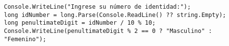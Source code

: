 \begin{lstlisting}
Console.WriteLine("Ingrese su número de identidad:");
long idNumber = long.Parse(Console.ReadLine() ?? string.Empty);
long penultimateDigit = idNumber / 10 % 10;
Console.WriteLine(penultimateDigit % 2 == 0 ? "Masculino" : "Femenino");
\end{lstlisting}